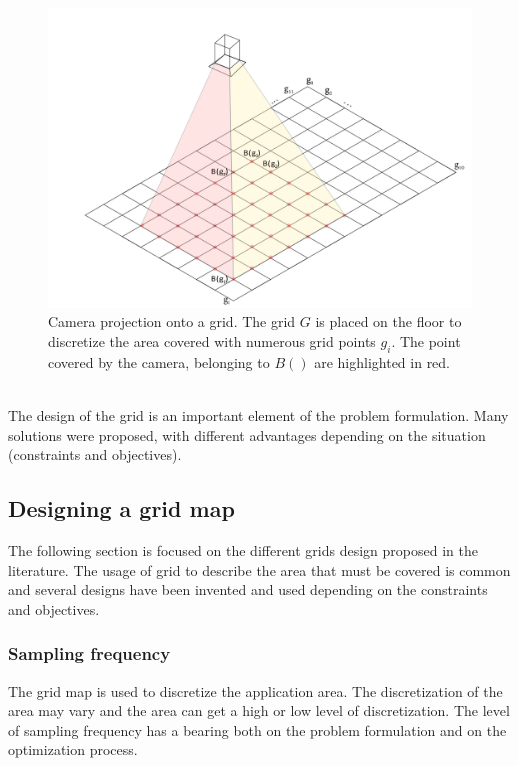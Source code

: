 \begin{figure}[t!]
		\centering
  		\includegraphics[width=\linewidth]{img/CamProjectOnGrid2.png}
  
 	 	\endminipage\hfill\caption{Camera projection onto a grid. The grid $G$ is placed on the floor to discretize the area covered with numerous grid points $g_i$. The point covered by the camera, belonging to $B()$ are highlighted in red.}\label{fig:cam_projOnGrid}
\end{figure}
\\ The design of the grid is an important element of the problem formulation. Many solutions were proposed, with different advantages depending on the situation (constraints and objectives).\\

\subsection{Designing a grid map} \label{sec:GridMap}%

The following section is focused on the different grids design proposed in the literature. The usage of grid to describe the area that must be covered is common and several designs have been invented and used depending on the constraints and objectives.  


\subsubsection{Sampling frequency} %
The grid map is used to discretize the application area. The discretization of the area may vary and the area can get a high or low level of discretization. The level of sampling frequency has a bearing both on the problem formulation and on the optimization process.

